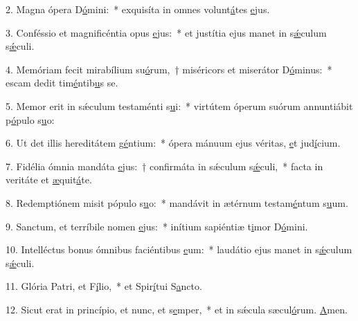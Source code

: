 2. Magna ópera D\uline{ó}mini:~* exquisíta in omnes volunt\uline{á}tes \uline{e}jus.\par 
3. Conféssio et magnificéntia opus \uline{e}jus:~* et justítia ejus manet in s\uline{ǽ}culum s\uline{ǽ}culi.\par 
4. Memóriam fecit mirabílium su\uline{ó}rum,~† miséricors et miserátor D\uline{ó}minus:~* escam dedit tim\uline{é}ntib\uline{u}s se.\par 
5. Memor erit in sǽculum testaménti s\uline{u}i:~* virtútem óperum suórum annuntiábit p\uline{ó}pulo s\uline{u}o:\par 
6. Ut det illis hereditátem g\uline{é}ntium:~* ópera mánuum ejus véritas, \uline{e}t jud\uline{í}cium.\par 
7. Fidélia ómnia mandáta \uline{e}jus:~† confirmáta in sǽculum s\uline{ǽ}culi,~* facta in veritáte et \uline{æ}quit\uline{á}te.\par 
8. Redemptiónem misit pópulo s\uline{u}o:~* mandávit in ætérnum testam\uline{é}ntum s\uline{u}um.\par 
9. Sanctum, et terríbile nomen \uline{e}jus:~* inítium sapiéntiæ t\uline{i}mor D\uline{ó}mini.\par 
10. Intelléctus bonus ómnibus faciéntibus \uline{e}um:~* laudátio ejus manet in s\uline{ǽ}culum s\uline{ǽ}culi.\par 
11. Glória Patri, et F\uline{í}lio,~* et Spir\uline{í}tui S\uline{a}ncto.\par 
12. Sicut erat in princípio, et nunc, et s\uline{e}mper,~* et in sǽcula sæcul\uline{ó}rum. \uline{A}men.\par 
